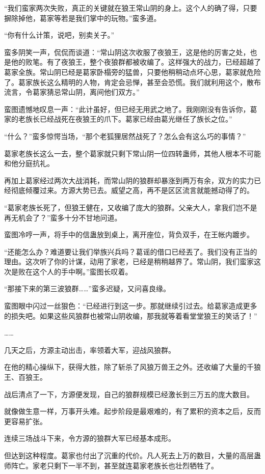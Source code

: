 \begin{this_body}
“我们蛮家两次失败，真正的关键就在狼王常山阴的身上。这个人的确了得，只要摒除掉他，葛家等若是我们掌中的玩物。”蛮多道。

“你有什么计策，说吧，别卖关子。”

蛮多阴笑一声，侃侃而谈道：“常山阴这次收服了夜狼王，这是他的厉害之处，也是他的败笔。有了夜狼王，整个夜狼群都被收编了。这样强大的战力，已经超越了葛家全族。常山阴已经是葛家卧榻旁的猛兽，只要他稍稍动点坏心思，葛家就危险了。葛家族长这么精明的人物，肯定会忌惮，甚至会恐慌。我们就利用这个，散布流言，令葛家猜忌常山阴，离间他们双方。”

蛮图遗憾地叹息一声：“此计虽好，但已经无用武之地了。我刚刚没有告诉你，葛家的老族长已经战死在夜狼王的爪下。葛家已经由葛光继任了族长之位。”

“什么？”蛮多惊愕当场，“那个老狐狸居然战死了？怎么会有这么巧的事情？”

葛家老族长这么一去，整个葛家就只剩下常山阴一位四转蛊师，其他人根本不可能和他分庭抗礼。

再加上葛家经过两次大战消耗，而常山阴的狼群却暴涨到两万有余，双方的实力已经彻底倾覆过来。方源大势已去。威望之高，再不是区区流言就能撼动得了的。

“葛家老族长死了，但狼王健在，又收编了庞大的狼群。父亲大人，拿我们岂不是再无机会了？”蛮多十分不甘地问道。

蛮图冷哼一声，将手中的信蛊放到桌上，离开座位，背负双手，在王帐内踱步。

“还能怎么办？难道要让我们举族兴兵吗？葛谣的借口已经丟了。我们没有正当的理由。这次听了你的计谋，动用了家老，已经是稍稍越界了。常山阴，我们蛮家这次是败在这个人的手中啊。”蛮图长叹着。

“那接下来的第三波狼群……”蛮多迟疑，又问喜良缘。

蛮图眼中闪过一丝狠色：“已经进行到这一步。那就继续引过去。给葛家造成更多的损失吧。如果这些风狼群也被常山阴收编，那我就等着看堂堂狼王的笑话了！”

……

几天之后，方源主动出击，率领着大军，迎战风狼群。

在他的精心操纵下，获得大胜，除了斩杀了风狼万兽王之外。还收编了大量的千狼王、百狼王。

战后清点了一下，方源便发现，自己的狼群规模已经激长到三万五的庞大数目。

就像做生意一样，万事开头难。起步阶段是最艰难的，有了累积的资本之后，反而更容易扩张。

连续三场战斗下来，令方源的狼群大军已经基本成形。

但达到这种程度。葛家也付出了沉重的代价。凡人死去上万的数目，大量的高层蛊师阵亡。家老只剩下一半不到，甚至就连葛家老族长也壮烈牺牲了。


\end{this_body}
